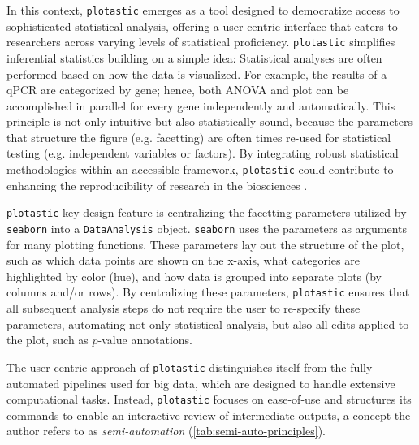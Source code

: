 In this context, \texttt{plotastic} emerges as a tool designed to democratize
access to sophisticated statistical analysis, offering a user-centric interface
that caters to researchers across varying levels of statistical proficiency.
\texttt{plotastic} simplifies inferential statistics building on a simple idea:
Statistical analyses are often performed based on how the data is visualized.
For example, the results of a qPCR are categorized by gene; hence, both ANOVA
and plot can be accomplished in parallel for every gene independently and
automatically. This principle is not only intuitive but also statistically
sound, because the parameters that structure the figure (e.g. facetting) are
often times re-used for statistical testing (e.g. independent variables or
factors). By integrating robust statistical methodologies within an accessible
framework, \texttt{plotastic} could contribute to enhancing the reproducibility
of research in the biosciences \cite{gomez-cabreroDataIntegrationEra2014}.

\texttt{plotastic} key design feature is centralizing the facetting
parameters utilized by \texttt{seaborn} into a \texttt{DataAnalysis} object.
\texttt{seaborn} uses the parameters \facetparams as arguments for many plotting functions. These
parameters lay out the structure of the plot, such as which data points are
shown on the x-axis, what categories are highlighted by color (hue), and how
data is grouped into separate plots (by columns and/or rows). By centralizing
these parameters, \texttt{plotastic} ensures that all subsequent analysis steps
do not require the user to re-specify these parameters, automating not only
statistical analysis, but also all edits applied to the plot, such as
$p$-value annotations.


The user-centric approach of \texttt{plotastic} distinguishes itself from the
fully automated pipelines used for big data, which are designed to handle
extensive computational tasks. Instead, \texttt{plotastic} focuses on
ease-of-use and structures its commands to enable an interactive review of
intermediate outputs, a concept the author refers to as \textit{semi-automation}
(\autoref{tab:semi-auto-principles}).

